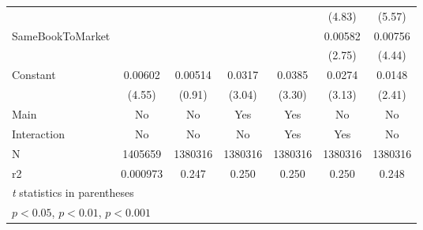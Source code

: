 {\begin{tabular}{l*{6}{c}}
                    &                     &                     &                     &                     &      (4.83)         &      (5.57)         \\
[1em]
SameBookToMarket    &                     &                     &                     &                     &     0.00582\sym{**} &     0.00756\sym{***}\\
                    &                     &                     &                     &                     &      (2.75)         &      (4.44)         \\
[1em]
Constant            &     0.00602\sym{***}&     0.00514         &      0.0317\sym{**} &      0.0385\sym{**} &      0.0274\sym{**} &      0.0148\sym{*}  \\
                    &      (4.55)         &      (0.91)         &      (3.04)         &      (3.30)         &      (3.13)         &      (2.41)         \\
\hline
Main                &          No         &          No         &         Yes         &         Yes         &          No         &          No         \\
Interaction         &          No         &          No         &          No         &         Yes         &         Yes         &          No         \\
N                   &     1405659         &     1380316         &     1380316         &     1380316         &     1380316         &     1380316         \\
r2                  &    0.000973         &       0.247         &       0.250         &       0.250         &       0.250         &       0.248         \\
\hline\hline
\multicolumn{7}{l}{\footnotesize \textit{t} statistics in parentheses}\\
\multicolumn{7}{l}{\footnotesize \sym{*} \(p<0.05\), \sym{**} \(p<0.01\), \sym{***} \(p<0.001\)}\\
\end{tabular}
}
